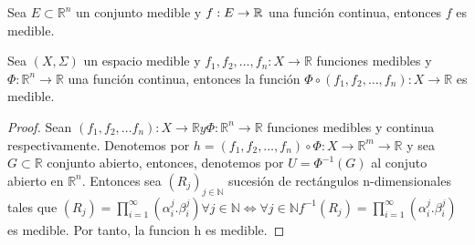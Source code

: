 \begin{corolario}
    Sea $E \subset \mathbb{R}^n$ un conjunto medible y $f: E \to \mathbb{R}$ una función continua, entonces $f$ es medible.
\end{corolario}

\begin{proposición}
Sea $(X, \Sigma)$ un espacio medible y $f_1, f_2, \dots, f_n: X \to \mathbb{R}$ funciones medibles y $\Phi: \mathbb{R}^n \to \mathbb{R}$ una función continua, entonces la función $\Phi \circ (f_1, f_2, \dots, f_n): X \to \mathbb{R}$ es medible.
\end{proposición}

\begin{proof}
    Sean $(f_1, f_2, \dots f_n): X \to \mathbb{R} y \Phi: \mathbb{R}^n \to \mathbb{R}$ funciones medibles y continua respectivamente. Denotemos por $h = (f_1, f_2, \dots, f_n) \circ \Phi: X \to \mathbb{R}^m \to \mathbb{R}$ y sea $G \subset \mathbb{R}$ conjunto abierto, entonces, denotemos por $U = \Phi^{-1}(G)$ al conjuto abierto en $\mathbb{R}^n$. Entonces sea $(R_j)_{j\in\mathbb{N}}$ sucesión de rectángulos n-dimensionales tales que $(R_j) = \prod_{i = 1}^{\infty}(\alpha_i^{j}. \beta_i^{j}) \forall j \in \mathbb{N} \iff \forall j \in \mathbb{N} f^{-1}(R_j) = \prod_{i = 1}^{\infty}(\alpha_i^{j}. \beta_i^{j})$ es medible. Por tanto, la funcion h es medible.
\end{proof}

